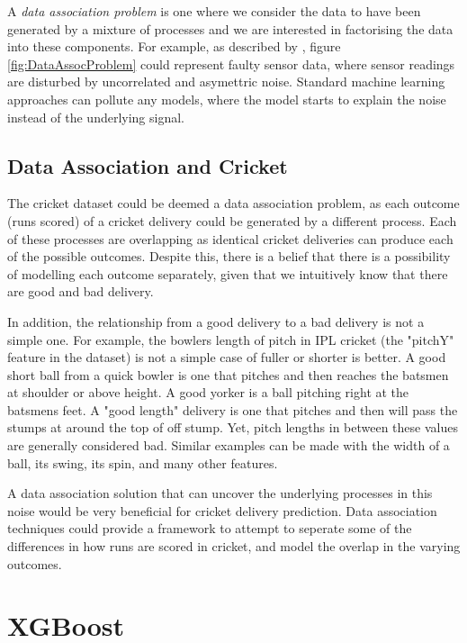 \documentclass[12pt,a4paper]{report}
\theoremstyle{definition}
\begin{document}
A \emph{data association problem} is one where we consider the data to have been generated by a mixture of processes and we are interested in factorising the data into these components. 
For example, as described by \citet{Kaiser2020}, figure \ref{fig:DataAssocProblem} could represent faulty sensor data, where sensor readings are disturbed by uncorrelated and asymettric noise. 
Standard machine learning approaches can pollute any models, where the model starts to explain the noise instead of the underlying signal. 

\subsection{Data Association and Cricket} \label{sec:DataAssocCricket}

The cricket dataset could be deemed a data association problem, as each outcome (runs scored) of a cricket delivery could be generated by a different process. 
Each of these processes are overlapping as identical cricket deliveries can produce each of the possible outcomes.
Despite this, there is a belief that there is a possibility of modelling each outcome separately, given that we intuitively know that there are good and bad delivery.

In addition, the relationship from a good delivery to a bad delivery is not a simple one. 
For example, the bowlers length of pitch in IPL cricket (the "pitchY" feature in the dataset) is not a simple case of fuller or shorter is better.
A good short ball from a quick bowler is one that pitches and then reaches the batsmen at shoulder or above height. 
A good yorker is a ball pitching right at the batsmens feet.
A "good length" delivery is one that pitches and then will pass the stumps at around the top of off stump.
Yet, pitch lengths in between these values are generally considered bad. 
Similar examples can be made with the width of a ball, its swing, its spin, and many other features.

A data association solution that can uncover the underlying processes in this noise would be very beneficial for cricket delivery prediction.
Data association techniques could provide a framework to attempt to seperate some of the differences in how runs are scored in cricket, and model the overlap in the varying outcomes.

\section{XGBoost}
\end{document}
